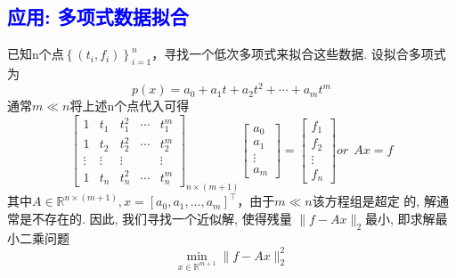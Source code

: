 \documentclass[12pt,a4paper]{article}
\begin{document}
\subsection{\textcolor{blue}{应用: 多项式数据拟合}}
\noindent 已知n个点$\left\{\left(t_{i}, f_{i}\right)\right\}_{i=1}^{n}$，寻找一个低次多项式来拟合这些数据. 设拟合多项式为
$$
p(x)=a_{0}+a_{1} t+a_{2} t^{2}+\cdots+a_{m} t^{m}
$$
通常$m \ll n$将上述n个点代入可得
$$
\left[\begin{array}{ccccc}
{1} & {t_{1}} & {t_{1}^{2}} & {\cdots} & {t_{1}^{m}} \\
 {1} & {t_{2}} & {t_{2}^{2}} & {\cdots} & {t_{2}^{m}} \\ {\vdots} & {\vdots} & {\vdots} & {} & {\vdots} \\
  {1} & {t_{n}} & {t_{n}^{2}} & {\cdots} & {t_{n}^{m}}\end{array}\right]_{n \times(m+1)}\left[\begin{array}{c}{a_{0}} \\ 
  {a_{1}} \\ 
  {\vdots} \\ 
  {a_{m}}
  \end{array}\right]=\left[\begin{array}{c}{f_{1}} \\ {f_{2}} \\ {\vdots} \\ {f_{n}}\end{array}\right] or ~~A x=f
$$
其中$A \in \mathbb{R}^{n \times(m+1)}, x=\left[a_{0}, a_{1}, \ldots, a_{m}\right]^{\top}$，由于$m \ll n$该方程组是超定 的, 解通常是不存在的. 因此, 我们寻找一个近似解, 使得残量
$\|f-A x\|_{2}$最小, 即求解最小二乘问题
$$
\min _{x \in \mathbb{R}^{m+1}}\|f-A x\|_{2}^{2}
$$
\end{document}
